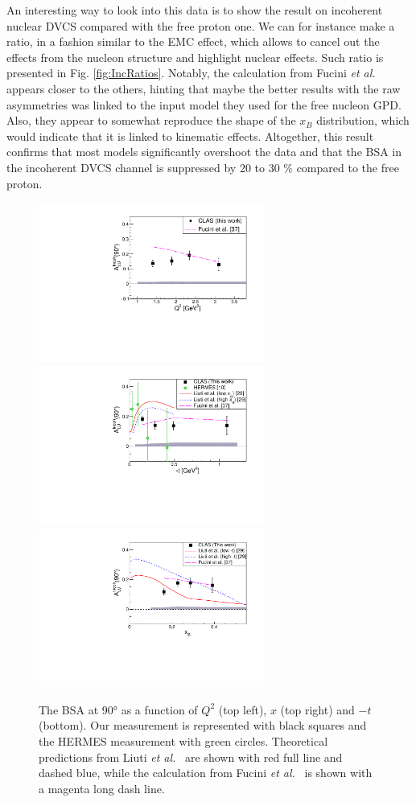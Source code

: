 \documentclass[aps,prc,preprint,superscriptaddress]{revtex4}
\begin{document}
An interesting way to look into this data is to show the result on incoherent nuclear DVCS compared 
with the free proton one. We can for instance make a ratio, in a fashion similar to the EMC 
effect, which allows to cancel out
the effects from the nucleon structure and highlight nuclear effects. Such ratio is presented
in Fig. \ref{fig:IncRatios}.
Notably, the calculation from Fucini {\it et al.}~\cite{Fucini:2019xlc} appears closer to the
others, hinting that maybe the better results with the raw asymmetries was linked to the
input model they used for the free nucleon GPD. Also, they appear to somewhat reproduce the 
shape of the $x_B$ distribution, which would indicate that it is linked to kinematic effects.
Altogether, this result confirms that most models significantly overshoot the data and that 
the BSA in the incoherent DVCS channel is suppressed by 20 to 30 \% compared to the free proton.

\begin{figure}[tbp!]
\center
\includegraphics[width=7.4cm]{fig3/ALU_90_p_vs_Q2_shortscenrario.pdf}
\includegraphics[width=7.4cm]{fig3/ALU_90_p_vs_t_shortscenrario.pdf}
\includegraphics[width=7.4cm]{fig3/ALU_90_p_vs_x_shortscenrario.pdf}
	\caption{The BSA at 90° as a function of  $Q^2$ (top left), $x$ (top right) and 
	$-t$ (bottom). Our measurement is represented with black squares and the HERMES 
	measurement \cite{Airapetian:2009cga} with green circles. Theoretical predictions 
	from Liuti {\it et al.}~\cite{Liuti:2005gi,GonzalezHernandez:2012jv} are shown 
	with red full line and dashed blue, while the calculation from Fucini 
	{\it et al.}~\cite{Fucini:2019xlc} is shown with a magenta long dash line.}
\label{fig:IncALU}
\end{figure}
\end{document}
